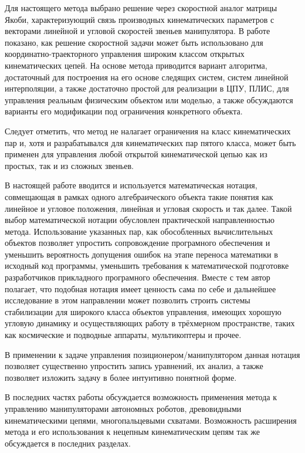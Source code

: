 Для настоящего метода выбрано решение через скоростной аналог матрицы Якоби, характеризующий связь производных кинематических параметров с векторами линейной и угловой скоростей звеньев манипулятора. В работе показано, как решение скоростной задачи может быть использовано для координатно-траекторного управления широким классом открытых кинематических цепей. На основе метода приводится вариант алгоритма, достаточный для построения на его основе следящих систем, систем линейной интерполяции, а также достаточно простой для реализации в ЦПУ, ПЛИС, для управления реальным физическим объектом или моделью, а также обсуждаются варианты его модификации под ограничения конкретного объекта.

Следует отметить, что метод не налагает ограничения на класс кинематических пар и, хотя и разрабатывался для кинематических пар пятого класса, может быть применен для управления любой открытой кинематической цепью как из простых, так и из сложных звеньев.

В настоящей работе вводится и используется математическая нотация, совмещающая в рамках одного алгебраического объекта такие понятия как линейное и угловое положения, линейная и угловая скорость и так далее. Такой выбор математической нотации обусловлен практической направленностью метода. Использование указанных пар, как обособленных вычислительных объектов позволяет упростить сопровождение програмного обеспечения и уменьшить вероятность допущения ошибок на этапе переноса математики в исходный код программы, уменьшить требования к математической подготовке разработчиков прикладного програмного обеспечения. Вместе с тем автор полагает, что подобная нотация имеет ценность сама по себе и дальнейшее исследование в этом направлении может позволить строить системы стабилизации для широкого класса объектов управления, имеющих хорошую угловую динамику и осуществляющих работу в трёхмерном пространстве, таких как космические и подводные аппараты, мультикоптеры и прочее.

В применении к задаче управления позиционером/манипулятором данная нотация позволяет существенно упростить запись уравнений, их анализ, а также позволяет изложить задачу в более интуитивно понятной форме.

В последних частях работы обсуждается возможность применения метода к управлению манипуляторами автономных роботов, древовидными кинематическими цепями, многопальцевыми схватами. Возможность расширения метода и его использования к нецепным кинематическим цепям так же обсуждается в последних разделах.